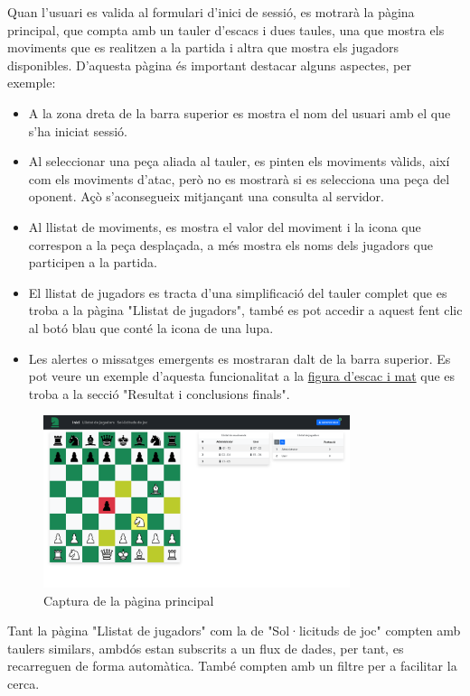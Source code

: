 \noindent
Quan l'usuari es valida al formulari d'inici de sessió, es motrarà la pàgina principal, que compta amb un tauler d'escacs i dues taules, una que mostra els moviments que es realitzen a la partida i altra que mostra els jugadors disponibles. D'aquesta pàgina és important destacar alguns aspectes, per exemple:
\begin{itemize}
    \item A la zona dreta de la barra superior es mostra el nom del usuari amb el que s'ha iniciat sessió.
    \item Al seleccionar una peça aliada al tauler, es pinten els moviments vàlids, així com els moviments d'atac, però no es mostrarà si es selecciona una peça del oponent. Açò s'aconsegueix mitjançant una consulta al servidor.
    \item Al llistat de moviments, es mostra el valor del moviment i la icona que correspon a la peça desplaçada, a més mostra els noms dels jugadors que participen a la partida.
    \item El llistat de jugadors es tracta d'una simplificació del tauler complet que es troba a la pàgina "Llistat de jugadors", també es pot accedir a aquest fent clic al botó blau que conté la icona de una lupa.
    \item Les alertes o missatges emergents es mostraran dalt de la barra superior. Es pot veure un exemple d'aquesta funcionalitat a la \hyperref[fig:Escac i mat]{figura d'escac i mat} que es troba a la secció "Resultat i conclusions finals".
\end{itemize}
\begin{figure}[H]
    \centering
    \includegraphics[width=0.8\textwidth]{images/index-escacs.png}
    \caption{Captura de la pàgina principal}
    \label{fig:Captura de la pàgina principal}
\end{figure}
\noindent
Tant la pàgina "Llistat de jugadors" com la de "Sol·licituds de joc" compten amb taulers similars, ambdós estan subscrits a un flux de dades, per tant, es recarreguen de forma automàtica. També compten amb un filtre per a facilitar la cerca.
